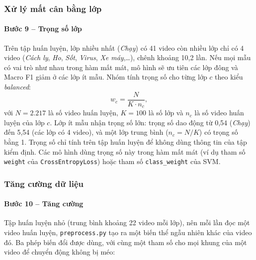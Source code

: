\subsubsection{Xử lý mất cân bằng lớp}
\label{subsec:pp_weights}

\paragraph{Bước 9 -- Trọng số lớp} Trên tập huấn luyện, lớp nhiều nhất (\textit{Chạy}) có 41 video còn nhiều lớp chỉ có 4 video (\textit{Cách ly}, \textit{Ho}, \textit{Sốt}, \textit{Virus}, \textit{Xe máy},\ldots), chênh khoảng 10,2 lần. Nếu mọi mẫu có vai trò như nhau trong hàm mất mát, mô hình sẽ ưu tiên các lớp đông và Macro F1 giảm ở các lớp ít mẫu. Nhóm tính trọng số cho từng lớp $c$ theo kiểu \textit{balanced}:
\begin{equation}
  w_c = \frac{N}{K \cdot n_c},
\end{equation}
với $N=2.217$ là số video huấn luyện, $K=100$ là số lớp và $n_c$ là số video huấn luyện của lớp $c$. Lớp ít mẫu nhận trọng số lớn: trọng số dao động từ 0,54 (\textit{Chạy}) đến 5,54 (các lớp có 4 video), và một lớp trung bình ($n_c = N/K$) có trọng số bằng 1. Trọng số chỉ tính trên tập huấn luyện để không dùng thông tin của tập kiểm định. Các mô hình dùng trọng số này trong hàm mất mát (ví dụ tham số \texttt{weight} của \texttt{CrossEntropyLoss}) hoặc tham số \texttt{class\_weight} của SVM.

\subsubsection{Tăng cường dữ liệu}
\label{subsec:pp_aug}

\paragraph{Bước 10 -- Tăng cường} Tập huấn luyện nhỏ (trung bình khoảng 22 video mỗi lớp), nên mỗi lần đọc một video huấn luyện, \texttt{preprocess.py} tạo ra một biến thể ngẫu nhiên khác của video đó. Ba phép biến đổi được dùng, với cùng một tham số cho mọi khung của một video để chuyển động không bị méo:

